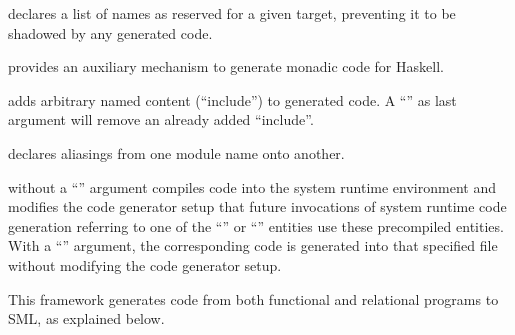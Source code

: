 \begin{isabellebody}
\begin{isamarkuptext}
\begin{description}
  \item \hyperlink{command.HOL.code-reserved}{\mbox{}} declares a list of names as
  reserved for a given target, preventing it to be shadowed by any
  generated code.

  \item \hyperlink{command.HOL.code-monad}{\mbox{}} provides an auxiliary mechanism
  to generate monadic code for Haskell.

  \item \hyperlink{command.HOL.code-include}{\mbox{}} adds arbitrary named content
  (``include'') to generated code.  A ``'' as last argument
  will remove an already added ``include''.

  \item \hyperlink{command.HOL.code-modulename}{\mbox{}} declares aliasings from one
  module name onto another.

  \item \hyperlink{command.HOL.code-reflect}{\mbox{}} without a ``''
  argument compiles code into the system runtime environment and
  modifies the code generator setup that future invocations of system
  runtime code generation referring to one of the ``'' or ``'' entities use these precompiled
  entities.  With a ``'' argument, the corresponding code
  is generated into that specified file without modifying the code
  generator setup.

  \end{description}%
\end{isamarkuptext}%
\isamarkuptrue%
%
\isamarkuptrue%
%
\begin{isamarkuptext}%
This framework generates code from both functional and
  relational programs to SML, as explained below.


\end{isamarkuptext}
\end{isabellebody}
